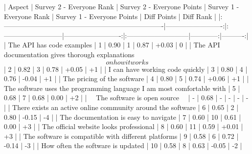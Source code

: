 \documentclass[11pt]{article}
\begin{document}
\begin{multicols}{2}
{    |                                Aspect                                 | Survey 2 - Everyone Rank | Survey 2 - Everyone	Points | Survey 1 - Everyone Rank | Survey 1 - Everyone Points | Diff Points | Diff Rank |
    |:----------------------------------------------------------------------|-------------------------:|:--------------------------|-------------------------:|:---------------------------|------------:|----------:|
    | The API has code examples                                             |                        1 | 0.90                      |                        1 | 0.87                       |       +0.03 |         0 |
    | The API documentation gives thorough explanations \[on how it works\] |                        2 | 0.82                      |                        3 | 0.78                       |       +0.05 |        +1 |
    | I can have working code quickly                                       |                        3 | 0.80                      |                        4 | 0.76                       |       -0.04 |        +1 |
    | The pricing of the software                                           |                        4 | 0.80                      |                        5 | 0.74                       |       +0.06 |        +1 |
    | The software uses the programming language I am most comfortable with |                        5 | 0.68                      |                        7 | 0.68                       |        0.00 |        +2 |
    | ~~The software is open source~~                                       |                        - | 0.68                      |                        - | -                          |           - |         - |
    | There exists an active online community around the software           |                        6 | 0.65                      |                        2 | 0.80                       |       -0.15 |        -4 |
    | The documentation is easy to navigate                                 |                        7 | 0.60                      |                       10 | 0.61                       |        0.00 |        +3 |
    | The official website looks professional                               |                        8 | 0.60                      |                       11 | 0.59                       |       +0.01 |        +3 |
    | The software is compatible with different platforms                   |                        9 | 0.58                      |                        6 | 0.72                       |       -0.14 |        -3 |
    | How often the software is updated                                     |                       10 | 0.58                      |                        8 | 0.63                       |       -0.05 |        -2 |
}
\end{multicols}
\end{document}
